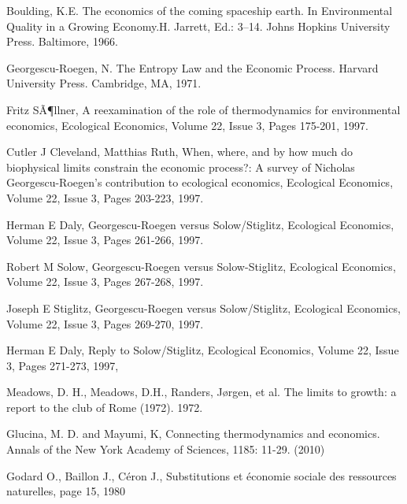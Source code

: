 \documentclass[12pt,a4paper]{article}%
\begin{document}
\begin{thebibliography}{99}                                                                                               %


Boulding, K.E. The economics of the coming spaceship
earth. In Environmental Quality in a Growing Economy.H. Jarrett, Ed.: 3--14.
Johns Hopkins University Press. Baltimore, 1966.

Georgescu-Roegen, N. The Entropy Law and the Economic
Process. Harvard University Press. Cambridge, MA, 1971.

Fritz SÃ¶llner, A reexamination of the role of
thermodynamics for environmental economics, Ecological Economics, Volume 22,
Issue 3, Pages 175-201, 1997.

Cutler J Cleveland, Matthias Ruth, When, where, and by
how much do biophysical limits constrain the economic process?: A survey of
Nicholas Georgescu-Roegen's contribution to ecological economics, Ecological
Economics, Volume 22, Issue 3, Pages 203-223, 1997.

Herman E Daly, Georgescu-Roegen versus Solow/Stiglitz,
Ecological Economics, Volume 22, Issue 3, Pages 261-266, 1997.

Robert M Solow, Georgescu-Roegen versus Solow-Stiglitz,
Ecological Economics, Volume 22, Issue 3, Pages 267-268, 1997.

Joseph E Stiglitz, Georgescu-Roegen versus
Solow/Stiglitz, Ecological Economics, Volume 22, Issue 3, Pages 269-270, 1997.

Herman E Daly, Reply to Solow/Stiglitz, Ecological
Economics, Volume 22, Issue 3, Pages 271-273, 1997,

Meadows, D. H., Meadows, D.H., Randers, J\o rgen, et al.
The limits to growth: a report to the club of Rome (1972). 1972.

Glucina, M. D. and Mayumi, K, Connecting thermodynamics
and economics. Annals of the New York Academy of Sciences, 1185: 11-29. (2010)

Godard O., Baillon J., Céron J., Substitutions et
économie sociale des ressources naturelles, page 15, 1980
\end{thebibliography}
\end{document}
